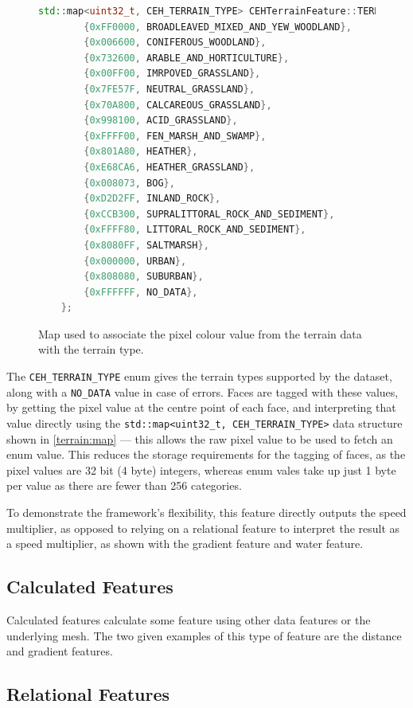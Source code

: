 \documentclass[12pt]{article}
\begin{document}
\begin{figure}[H]
  \centering
  \begin{lstlisting}[language=c++]
	std::map<uint32_t, CEH_TERRAIN_TYPE> CEHTerrainFeature::TERRAIN_COLOURS = {
		{0xFF0000, BROADLEAVED_MIXED_AND_YEW_WOODLAND},
		{0x006600, CONIFEROUS_WOODLAND},
		{0x732600, ARABLE_AND_HORTICULTURE},
		{0x00FF00, IMRPOVED_GRASSLAND},
		{0x7FE57F, NEUTRAL_GRASSLAND},
		{0x70A800, CALCAREOUS_GRASSLAND},
		{0x998100, ACID_GRASSLAND},
		{0xFFFF00, FEN_MARSH_AND_SWAMP},
		{0x801A80, HEATHER},
		{0xE68CA6, HEATHER_GRASSLAND},
		{0x008073, BOG},
		{0xD2D2FF, INLAND_ROCK},
		{0xCCB300, SUPRALITTORAL_ROCK_AND_SEDIMENT},
		{0xFFFF80, LITTORAL_ROCK_AND_SEDIMENT},
		{0x8080FF, SALTMARSH},
		{0x000000, URBAN},
		{0x808080, SUBURBAN},
		{0xFFFFFF, NO_DATA},
	};
	\end{lstlisting}
  \vspace{-2em}
  \caption{Map used to associate the pixel colour value from the terrain data with the terrain type.}
  \label{terrain:map}
\end{figure}

The \texttt{CEH\_TERRAIN\_TYPE} enum gives the terrain types supported by the dataset, along with a \texttt{NO\_DATA} value in case of errors. Faces are tagged with these values, by getting the pixel value at the centre point of each face, and interpreting that value directly using the \texttt{std::map<uint32\_t, CEH\_TERRAIN\_TYPE>} data structure shown in \autoref{terrain:map} --- this allows the raw pixel value to be used to fetch an enum value. This reduces the storage requirements for the tagging of faces, as the pixel values are 32 bit (4 byte) integers, whereas enum vales take up just 1 byte per value as there are fewer than 256 categories.

To demonstrate the framework's flexibility, this feature directly outputs the speed multiplier, as opposed to relying on a relational feature to interpret the result as a speed multiplier, as shown with the gradient feature and water feature.

\subsection{Calculated Features}

Calculated features calculate some feature using other data features or the underlying mesh. The two given examples of this type of feature are the distance and gradient features.

\subsection{Relational Features}
\end{document}
